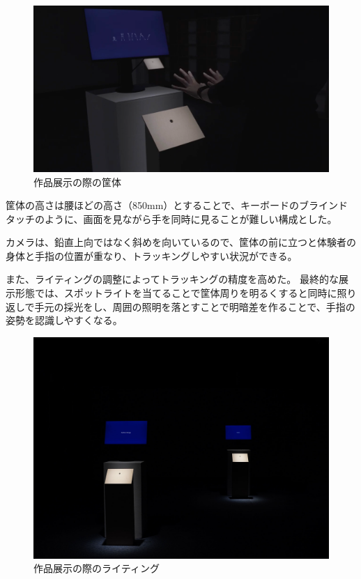 \begin{figure}[H]
  \centering
  \includegraphics[width=12cm]{img/kyotai_ver2.png}
  \caption{作品展示の際の筐体}
  \label{fig:kyotai_ver2}
\end{figure}

筐体の高さは腰ほどの高さ（850mm）とすることで、キーボードのブラインドタッチのように、画面を見ながら手を同時に見ることが難しい構成とした。

カメラは、鉛直上向ではなく斜めを向いているので、筐体の前に立つと体験者の身体と手指の位置が重なり、トラッキングしやすい状況ができる。

また、ライティングの調整によってトラッキングの精度を高めた。
最終的な展示形態では、スポットライトを当てることで筐体周りを明るくすると同時に照り返しで手元の採光をし、周囲の照明を落とすことで明暗差を作ることで、手指の姿勢を認識しやすくなる。

\begin{figure}[H]
  \centering
  \includegraphics[width=12cm]{img/lighting.jpg}
  \caption{作品展示の際のライティング}
  \label{fig:lighting}
\end{figure}

